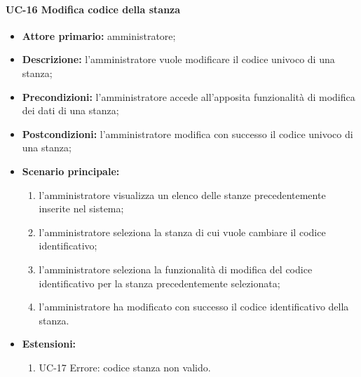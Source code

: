 \paragraph{UC-16 Modifica codice della stanza}
\begin{itemize}
	\item \textbf{Attore primario:} amministratore;
	\item\textbf{Descrizione:} l'amministratore vuole modificare il codice univoco di una stanza;
	\item\textbf{Precondizioni:} l'amministratore accede all'apposita funzionalità di modifica dei dati di una stanza;
	\item\textbf{Postcondizioni:} l'amministratore modifica con successo il codice univoco di una stanza;
	\item \textbf{Scenario principale:}
	      \begin{enumerate}
		      \item l'amministratore visualizza un elenco delle stanze precedentemente inserite nel sistema;
		      \item l'amministratore seleziona la stanza di cui vuole cambiare il codice identificativo;
		      \item l'amministratore seleziona la funzionalità di modifica del codice identificativo per la stanza precedentemente selezionata;
		      \item l'amministratore ha modificato con successo il codice identificativo della stanza.
	      \end{enumerate}
	\item \textbf{Estensioni:}
		\begin{enumerate}
		      \item UC-17 Errore: codice stanza non valido.
	      \end{enumerate}
\end{itemize}

